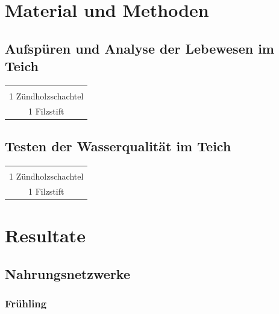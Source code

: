 \documentclass{article}
\begin{document}
\section{Material und Methoden}
    
    \subsection{Aufspüren und Analyse der Lebewesen im Teich}
    
    
        \begin{table}[h!]
        \centering
        \begin{tabular}{|c|} 
         \hline
         \\
         1 Zündholzschachtel \\
         1 Filzstift \\[1ex]
         \hline
        \end{tabular}
        \label{Tiere}
        \end{table}
        
    \subsection{Testen der Wasserqualität im Teich}
    
        \begin{table}[h!]
        \centering
        \begin{tabular}{|c|} 
         \hline
         \\
         1 Zündholzschachtel \\
         1 Filzstift \\[1ex]
         \hline
        \end{tabular}
        \label{Praktikum1}
        \end{table}

    

\section{Resultate}

    \subsection{Nahrungsnetzwerke}
        
    
        \subsubsection{Frühling}
        
\end{document}
